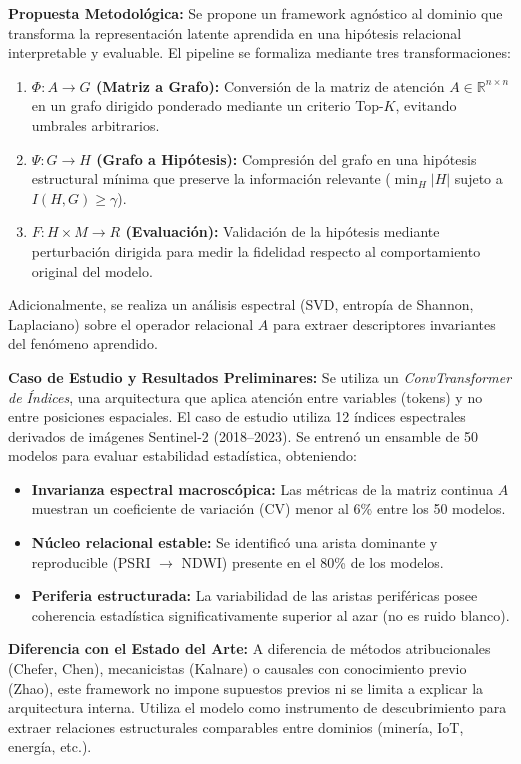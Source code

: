 \documentclass[12pt,letterpaper]{article}
\begin{document}
\textbf{Propuesta Metodológica:} Se propone un framework agnóstico al dominio que transforma la representación latente aprendida en una hipótesis relacional interpretable y evaluable. El pipeline se formaliza mediante tres transformaciones:
\begin{enumerate}[leftmargin=*, itemsep=0pt]
    \item \textbf{$\Phi: A \rightarrow G$ (Matriz a Grafo):} Conversión de la matriz de atención $A \in \mathbb{R}^{n \times n}$ en un grafo dirigido ponderado mediante un criterio Top-$K$, evitando umbrales arbitrarios.
    \item \textbf{$\Psi: G \rightarrow H$ (Grafo a Hipótesis):} Compresión del grafo en una hipótesis estructural mínima que preserve la información relevante ($\min_H |H|$ sujeto a $I(H,G) \geq \gamma$).
    \item \textbf{$F: H \times M \rightarrow R$ (Evaluación):} Validación de la hipótesis mediante perturbación dirigida para medir la fidelidad respecto al comportamiento original del modelo.
\end{enumerate}
Adicionalmente, se realiza un análisis espectral (SVD, entropía de Shannon, Laplaciano) sobre el operador relacional $A$ para extraer descriptores invariantes del fenómeno aprendido.

\textbf{Caso de Estudio y Resultados Preliminares:} Se utiliza un \textit{ConvTransformer de Índices}, una arquitectura que aplica atención entre variables (tokens) y no entre posiciones espaciales. El caso de estudio utiliza 12 índices espectrales derivados de imágenes Sentinel-2 (2018--2023). Se entrenó un ensamble de 50 modelos para evaluar estabilidad estadística, obteniendo:
\begin{itemize}[leftmargin=*, itemsep=0pt]
    \item \textbf{Invarianza espectral macroscópica:} Las métricas de la matriz continua $A$ muestran un coeficiente de variación (CV) menor al 6\% entre los 50 modelos.
    \item \textbf{Núcleo relacional estable:} Se identificó una arista dominante y reproducible (PSRI $\rightarrow$ NDWI) presente en el 80\% de los modelos.
    \item \textbf{Periferia estructurada:} La variabilidad de las aristas periféricas posee coherencia estadística significativamente superior al azar (no es ruido blanco).
\end{itemize}

\textbf{Diferencia con el Estado del Arte:} A diferencia de métodos atribucionales (Chefer, Chen), mecanicistas (Kalnare) o causales con conocimiento previo (Zhao), este framework no impone supuestos previos ni se limita a explicar la arquitectura interna. Utiliza el modelo como instrumento de descubrimiento para extraer relaciones estructurales comparables entre dominios (minería, IoT, energía, etc.).
\end{document}
